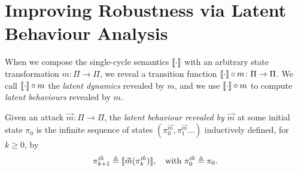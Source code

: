 {{\section{Improving Robustness via Latent Behaviour Analysis}
\label{sec:CPSRobustness:LatentBehaviours} 
When we compose the single-cycle semantics ${{{\llbracket\cdot\rrbracket}}}$ with an arbitrary state transformation $m\colon \Pi\rightarrow\Pi$, we reveal a transition function ${{{\llbracket\cdot\rrbracket}}}\circ m\colon\Pi\rightarrow\Pi$. We call ${{{\llbracket\cdot\rrbracket}}}\circ m$ the \emph{latent dynamics} revealed by $m$, and we use ${{{\llbracket\cdot\rrbracket}}}\circ m$ to compute \emph{latent behaviours} revealed by $m$.%

\begin{definition}
  \label{def:CPSRobustness:LatentBehaviour}
  Given an attack $\vec{m}\colon \Pi\rightarrow \Pi$, the \emph{latent behaviour revealed by $\vec{m}$} at some initial state $\pi_0$ is the infinite sequence of states $(\pi^{\vec{m}}_0, \pi^{\vec{m}}_1\ldots)$ inductively defined, for $k\geq 0$, by 
  \begin{align}
    \label{eq:newkCycle}
    {\pi}^{\vec{m}}_{k+1}\triangleq {{\llbracket\vec{m}({\pi}^{\vec{m}}_{k})\rrbracket}}, \quad \text{with ${\pi^{\vec{m}}_{0}}\triangleq \pi_0$.}
  \end{align}
\end{definition}
}}
